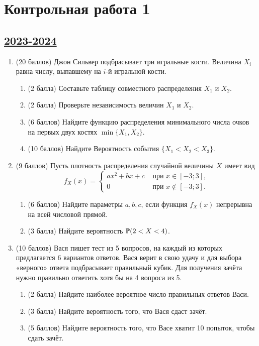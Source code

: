 
\newpage
\thispagestyle{empty}
\section{Контрольная работа 1}


\subsection[2023-2024]{\hyperref[sec:sol_kr_01_2023_2024]{2023-2024}}
\label{sec:kr_01_2023_2024} %

\begin{enumerate}
  \item (20 баллов) Джон Сильвер подбрасывает три игральные кости.
  Величина $X_i$ равна числу, выпавшему на $i$-й игральной кости.
 \begin{enumerate}
 \item (2 балла) Составьте таблицу совместного распределения $X_1$ и $X_2$.
 \item (2 балла) Проверьте независимость величин $X_1$ и $X_2$.
 \item (6 баллов) Найдите функцию распределения минимального числа очков на первых двух костях $\min\{ X_1, X_2\}$.
 \item (10 баллов) Найдите Вероятность события $\{ X_1 < X_2 < X_3 \}$.
 \end{enumerate}
 
 \item (9 баллов) Пусть плотность распределения случайной величины $X$ имеет вид
 \[
 f_X(x) = \begin{cases}
    a x^2+b x+c & \text { при } x \in[-3 ; 3], \\ 
    0 & \text { при } x \notin[-3 ; 3].
  \end{cases}
 \]
 \begin{enumerate}
 \item (6 баллов) Найдите параметры $a, b, c$, если функция $f_X(x)$ непрерывна на всей числовой прямой. 
 \item (3 балла) Найдите вероятность $\P( 2 < X < 4 )$.
 \end{enumerate}
 
 
 
 \item (10 баллов) Вася пишет тест из 5 вопросов, на каждый из которых предлагается 6 вариантов ответов. 
 Вася верит в свою удачу и для выбора «верного» ответа подбрасывает правильный кубик. 
 Для получения зачёта нужно правильно ответить хотя бы на 4 вопроса из 5. 
 \begin{enumerate}
 \item (2 балла) Найдите наиболее вероятное число правильных ответов Васи.
 \item (3 балла) Найдите вероятность того, что Вася сдаст зачёт.
 \item (5 баллов) Найдите вероятность того, что Васе хватит 10 попыток, чтобы сдать зачёт.
 \end{enumerate}
 

\end{enumerate}
